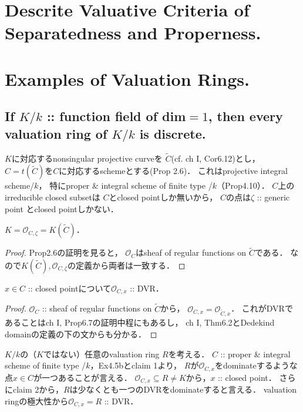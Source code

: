 \documentclass[a4paper]{jsarticle}
\newcommand{\shO}{\mathcal{O}}
\begin{document}
\section{Descrite Valuative Criteria of Separatedness and Properness.} %

\section{Examples of Valuation Rings.} %
    \subsection{If $K/k$ :: function field of dim$=1$, then every valuation ring of $K/k$ is discrete.}
    $K$に対応するnonsingular projective curveを
    $\tilde{C}$(cf. ch I, Cor6.12)とし，
    $C=t(\tilde{C})$を$C$に対応するschemeとする(Prop 2.6)．
    これはprojective integral scheme/$k$，
    特にproper \& integral scheme of finite type /$k$（Prop4.10）．
    $C$上のirreducible closed subsetは
    $C$とclosed pointしか無いから，
    $C$の点は$\zeta$ :: generic point とclosed pointしかない．

    \begin{Claim}[claim 1]
        $K=\shO_{C,\zeta}=K(\tilde{C})$．
    \end{Claim}
    \begin{proof}
        Prop2.6の証明を見ると，
        $\shO_C$はsheaf of regular functions on $\tilde{C}$である．
        なので$K(\tilde{C}), \shO_{C,\zeta}$の定義から両者は一致する．
    \end{proof}

    \begin{Claim}[claim 2]
        $x \in C$ :: closed pointについて$\shO_{C,x}$ :: DVR．
    \end{Claim}
    \begin{proof}
        $\shO_C$ :: sheaf of regular functions on $\tilde{C}$から，
        $\shO_{C,x}=\shO_{\tilde{C},x}$．
        これがDVRであることはch I, Prop6.7の証明中程にもあるし，
        ch I, Thm6.2とDedekind domainの定義の下の文からも分かる．
    \end{proof}

    $K/k$の（$K$ではない）任意のvaluation ring $R$を考える．
    $C$ :: proper \& integral scheme of finite type /$k$，Ex4.5bとclaim 1より，
    $R$が$\shO_{C,x}$をdominateするような点$x \in C$が一つあることが言える．
    $\shO_{C,x} \subseteq R \neq K$から，$x$ :: closed point．
    さらにclaim 2から，$R$は少なくとも一つのDVRをdominateすると言える．
    valuation ringの極大性から$\shO_{C,x}=R$ :: DVR．
\end{document}
